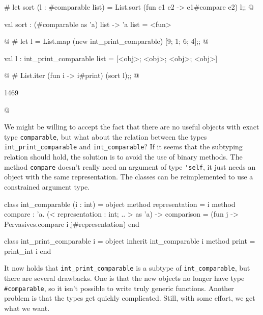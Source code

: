 \begin{ocaml}
# let sort (l : #comparable list) = List.sort (fun e1 e2 -> e1#compare e2) l;;
@
\begin{topoutput}
val sort : (#comparable as 'a) list -> 'a list = <fun>
\end{topoutput}
@
# let l = List.map (new int_print_comparable) [9; 1; 6; 4];;
@
\begin{topoutput}
val l : int_print_comparable list = [<obj>; <obj>; <obj>; <obj>]
\end{topoutput}
@
# List.iter (fun i -> i#print) (sort l);;
@
\begin{topoutput}
1469
\end{topoutput}
@
\end{ocaml}


We might be willing to accept the fact that there are no useful objects with exact
type \hbox{\lstinline/comparable/}, but what about the relation between the
types \hbox{\lstinline/int_print_comparable/} and \hbox{\lstinline/int_comparable/}?  If it seems that the
subtyping relation should hold, the solution is to avoid the use of binary methods.  The
method \hbox{\lstinline/compare/} doesn't really need an argument of type \hbox{\lstinline/'self/},
it just needs an object with the same representation.  The classes can be reimplemented
to use a constrained argument type.

\begin{ocaml}
class int_comparable (i : int) =
object
   method representation = i
   method compare : 'a. (< representation : int; .. > as 'a) -> comparison =
      (fun j -> Pervasives.compare i j#representation)
end

class int_print_comparable i =
object
   inherit int_comparable i
   method print = print_int i
end
\end{ocaml}
%
It now holds that \hbox{\lstinline/int_print_comparable/} is a subtype of \hbox{\lstinline/int_comparable/}, but
there are several drawbacks.  One is that the new objects no longer have
type \hbox{\lstinline/#comparable/}, so it isn't possible to write truly generic functions.  Another
problem is that the types get quickly complicated.  Still, with some effort, we get what we want.

